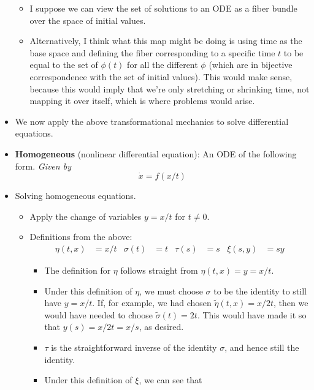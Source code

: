 \documentclass[../notes.tex]{subfiles}
\begin{document}
\begin{itemize}
    \begin{itemize}
        \item I suppose we can view the set of solutions to an ODE as a fiber bundle over the space of initial values.
        \item Alternatively, I think what this map might be doing is using time as the base space and defining the fiber corresponding to a specific time $t$ to be equal to the set of $\phi(t)$ for all the different $\phi$ (which are in bijective correspondence with the set of initial values). This would make sense, because this would imply that we're only stretching or shrinking time, not mapping it over itself, which is where problems would arise.
    \end{itemize}
    \item We now apply the above transformational mechanics to solve differential equations.
    \item \textbf{Homogeneous} (nonlinear differential equation): An ODE of the following form. \emph{Given by}
    \begin{equation*}
        \dot{x} = f(x/t)
    \end{equation*}
    \item Solving homogeneous equations.
    \begin{itemize}
        \item Apply the change of variables $y=x/t$ for $t\neq 0$.
        \item Definitions from the above:
        \begin{align*}
            \eta(t,x) &= x/t&
            \sigma(t) &= t&
            \tau(s) &= s&
            \xi(s,y) &= sy
        \end{align*}
        \begin{itemize}
            \item The definition for $\eta$ follows straight from $\eta(t,x)=y=x/t$.
            \item Under this definition of $\eta$, we must choose $\sigma$ to be the identity to still have $y=x/t$. If, for example, we had chosen $\tilde{\eta}(t,x)=x/2t$, then we would have needed to choose $\tilde{\sigma}(t)=2t$. This would have made it so that $y(s)=x/2t=x/s$, as desired.
            \item $\tau$ is the straightforward inverse of the identity $\sigma$, and hence still the identity.
            \item Under this definition of $\xi$, we can see that
            \begin{gather*}

\end{gather*}
\end{itemize}
\end{itemize}
\end{itemize}
\end{document}
